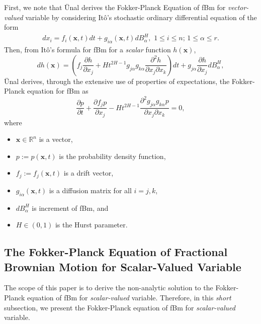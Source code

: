 \documentclass[preprint, 12pt]{elsarticle}
\numberwithin{equation}{section}
\theoremstyle{plain}
\theoremstyle{remark}
\newcommand{\assign}{:=}
\begin{document}
First, we note that {\" U}nal \citep{Unal} derives the Fokker-Planck Equation of fBm for \emph{vector-valued} variable by considering It{\^ o}'s stochastic ordinary differential equation of the form
\begin{eqnarray*}
d x_i = f_i (\mathbf{x}, t) d t + g_{i \alpha} (\mathbf{x}, t) d B^H_{\alpha}, \,\, 1 \leqslant i \leqslant n \text{; } 1 \leqslant \alpha \leqslant r.
\end{eqnarray*}
Then, from It{\^ o}'s formula for fBm for a {\emph{scalar}} function $h (\mathbf{x})$,
\begin{equation}
d h (\mathbf{x}) = \left( f_j  \frac{\partial h}{\partial x_j} + H t^{2 H - 1} g_{j \alpha} g_{k \alpha}  \frac{\partial^2 h}{\partial x_j \partial x_k} \right) d t + g_{j \alpha}  \frac{\partial h}{\partial x_j} d B_{\alpha}^H \label{scalarh},
\end{equation}
{\" U}nal derives, through the extensive use of properties of expectations, the Fokker-Planck equation for fBm as
\begin{equation}
\frac{\partial p}{\partial t} + \frac{\partial f_j p}{\partial x_j} - H t^{2 H - 1}  \frac{\partial^2 g_{j \alpha} g_{k \alpha} p}{\partial x_j \partial x_k} = 0, \label{genFPK}
\end{equation}
where
\begin{itemize}
\item $\mathbf{x} \in \mathbb{R}^n$ is a vector,
\item $p\assign p(\mathbf{x},t)$ is the probability density function,
\item $f_j \assign f_j (\mathbf{x}, t)$ is a drift vector,
\item $g_{i \alpha} (\mathbf{x}, t)$ is a diffusion matrix for all $i=j,k$,
\item $d B^H_{\alpha}$ is increment of fBm, and  
\item $H\in(0,1)$ is the Hurst parameter.
\end{itemize}

\subsection{The Fokker-Planck Equation of Fractional Brownian Motion for Scalar-Valued Variable}

The scope of this paper is to derive the non-analytic solution to the Fokker-Planck equation of fBm for \emph{scalar-valued} variable. Therefore, in this \emph{short} subsection, we present the Fokker-Planck equation of fBm for \emph{scalar-valued} variable.
\end{document}
